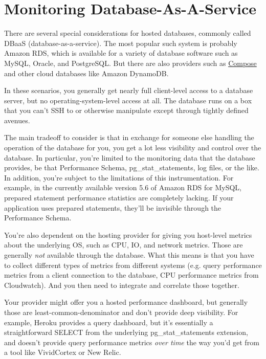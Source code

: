 \documentclass{vivid_layout}
\begin{document}
\section{Monitoring Database-As-A-Service}

There are several special considerations for hosted databases, commonly called
DBaaS (database-as-a-service). The most popular such system is probably Amazon
RDS, which is available for a variety of database software such as MySQL,
Oracle, and PostgreSQL. But there are also providers such as
\href{http://compose.io}{Compose} and other cloud databases like Amazon
DynamoDB.

In these scenarios, you generally get nearly full client-level access to a
database server, but no operating-system-level access at all. The database runs
on a box that you can't SSH to or otherwise manipulate except through tightly
defined avenues.

The main tradeoff to consider is that in exchange for someone else handling the
operation of the database for you, you get a lot less visibility and control
over the database. In particular, you're limited to the monitoring data that the
database provides, be that Performance Schema, pg\_stat\_statements, log files,
or the like.  In addition, you're subject to the limitations of this
instrumentation. For example, in the currently available version 5.6 of Amazon
RDS for MySQL, prepared statement performance statistics are completely lacking.
If your application uses prepared statements, they'll be invisible through the
Performance Schema.

You're also dependent on the hosting provider for giving you host-level metrics
about the underlying OS, such as CPU, IO, and network metrics. Those are
generally \emph{not} available through the database. What this means is that you
have to collect different types of metrics from different systems (e.g. query
performance metrics from a client connection to the database, CPU performance
metrics from Cloudwatch). And you then need to integrate and correlate those
together.

Your provider might offer you a hosted performance dashboard, but generally
those are least-common-denominator and don't provide deep visibility. For
example, Heroku provides a query dashboard, but it's essentially a
straightforward SELECT from the underlying pg\_stat\_statements extension, and
doesn't provide query performance metrics \emph{over time} the way you'd get
from a tool like VividCortex or New Relic.
\end{document}

